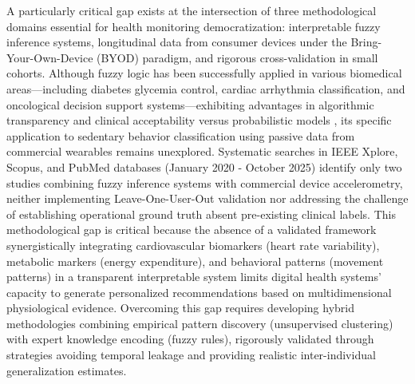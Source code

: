 \documentclass[journal,twoside,web]{ieeecolor}
\begin{document}
A particularly critical gap exists at the intersection of three methodological domains essential for health monitoring democratization: interpretable fuzzy inference systems, longitudinal data from consumer devices under the Bring-Your-Own-Device (BYOD) paradigm, and rigorous cross-validation in small cohorts. Although fuzzy logic has been successfully applied in various biomedical areas---including diabetes glycemia control, cardiac arrhythmia classification, and oncological decision support systems---exhibiting advantages in algorithmic transparency and clinical acceptability versus probabilistic models \cite{Kaur2022,Seoni2023,Nambison2024}, its specific application to sedentary behavior classification using passive data from commercial wearables remains unexplored. Systematic searches in IEEE Xplore, Scopus, and PubMed databases (January 2020 - October 2025) identify only two studies combining fuzzy inference systems with commercial device accelerometry, neither implementing Leave-One-User-Out validation nor addressing the challenge of establishing operational ground truth absent pre-existing clinical labels. This methodological gap is critical because the absence of a validated framework synergistically integrating cardiovascular biomarkers (heart rate variability), metabolic markers (energy expenditure), and behavioral patterns (movement patterns) in a transparent interpretable system limits digital health systems' capacity to generate personalized recommendations based on multidimensional physiological evidence. Overcoming this gap requires developing hybrid methodologies combining empirical pattern discovery (unsupervised clustering) with expert knowledge encoding (fuzzy rules), rigorously validated through strategies avoiding temporal leakage and providing realistic inter-individual generalization estimates.
\end{document}
